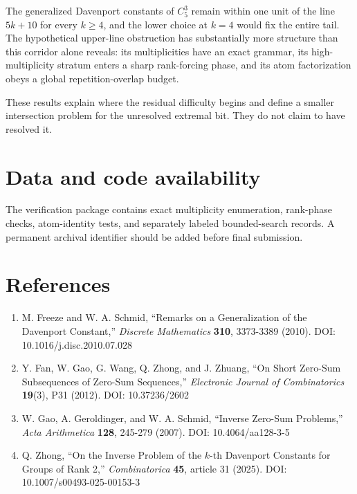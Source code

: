 \documentclass[
  11pt,
]{article}
\providecommand{\tightlist}{%
  \setlength{\itemsep}{0pt}\setlength{\parskip}{0pt}}
\begin{document}
The generalized Davenport constants of \(C_5^3\) remain within one unit
of the line \(5k+10\) for every \(k\ge4\), and the lower choice at
\(k=4\) would fix the entire tail. The hypothetical upper-line
obstruction has substantially more structure than this corridor alone
reveals: its multiplicities have an exact grammar, its high-multiplicity
stratum enters a sharp rank-forcing phase, and its atom factorization
obeys a global repetition-overlap budget.

These results explain where the residual difficulty begins and define a
smaller intersection problem for the unresolved extremal bit. They do
not claim to have resolved it.

\hypertarget{data-and-code-availability}{%
\section{Data and code availability}\label{data-and-code-availability}}

The verification package contains exact multiplicity enumeration,
rank-phase checks, atom-identity tests, and separately labeled
bounded-search records. A permanent archival identifier should be added
before final submission.

\hypertarget{references}{%
\section{References}\label{references}}

\begin{enumerate}
\def\labelenumi{\arabic{enumi}.}
\tightlist
\item
  M. Freeze and W. A. Schmid, ``Remarks on a Generalization of the
  Davenport Constant,'' \emph{Discrete Mathematics} \textbf{310},
  3373-3389 (2010). DOI: 10.1016/j.disc.2010.07.028
\item
  Y. Fan, W. Gao, G. Wang, Q. Zhong, and J. Zhuang, ``On Short Zero-Sum
  Subsequences of Zero-Sum Sequences,'' \emph{Electronic Journal of
  Combinatorics} \textbf{19}(3), P31 (2012). DOI: 10.37236/2602
\item
  W. Gao, A. Geroldinger, and W. A. Schmid, ``Inverse Zero-Sum
  Problems,'' \emph{Acta Arithmetica} \textbf{128}, 245-279 (2007). DOI:
  10.4064/aa128-3-5
\item
  Q. Zhong, ``On the Inverse Problem of the \(k\)-th Davenport Constants
  for Groups of Rank 2,'' \emph{Combinatorica} \textbf{45}, article 31
  (2025). DOI: 10.1007/s00493-025-00153-3
\end{enumerate}
\end{document}
